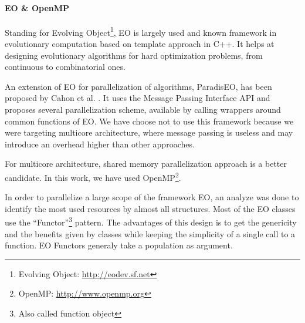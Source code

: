\documentclass{sig-alternate}
\newcommand{\DAEYAHSP}{{\sc DaE$_{\text{YAHSP}}$}}
\begin{document}
\paragraph{EO \& OpenMP} %


Standing for Evolving Object\footnote{Evolving Object:
\url{http://eodev.sf.net}}, EO is largely used and known framework in
evolutionary computation based on template approach in C++. It helps at
designing evolutionary algorithms for hard optimization problems, from
continuous to combinatorial ones.

An extension of EO for parallelization of algorithms, ParadisEO, has been
proposed by Cahon et al. \cite{paradiseo:JHeuristics2004}. It uses the Message
Passing Interface API and proposes several parallelization scheme, available by
calling wrappers around common functions of EO. We have choose not to use this
framework because we were targeting multicore architecture, where message
passing is useless and may introduce an overhead higher than other approaches. 


For multicore architecture, shared memory parallelization approach is a better
candidate. In this work, we have used OpenMP\footnote{OpenMP: \url{http://www.openmp.org}}.


In order to parallelize a large scope of the framework EO, an analyze was done
to identify the most used resources by almost all structures. Most of the EO
classes use the ``Functor''\footnote{Also called function object} pattern. The
advantages of this design is to get the genericity and the benefits given by
classes while keeping the simplicity of a single call to a function. EO Functors
generaly take a population as argument.
\end{document}

